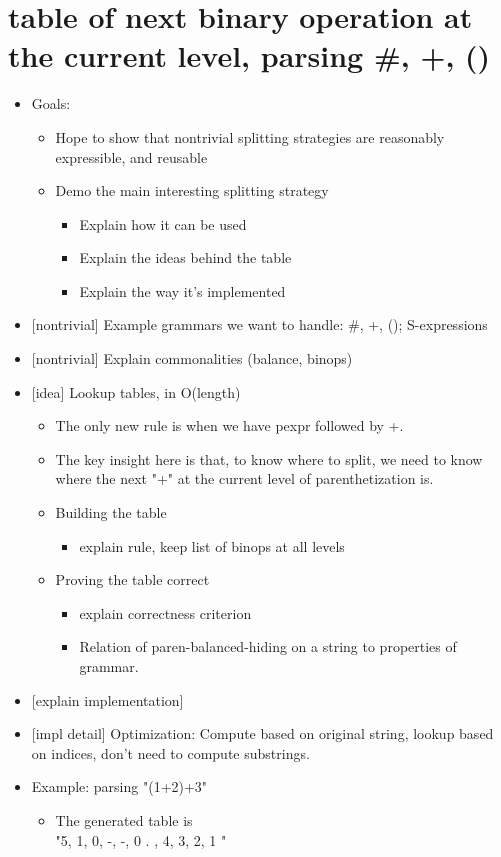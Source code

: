 \chapter{table of next binary operation at the current level, parsing \#, +, ()}
  \begin{itemize} \item  Goals:
    \begin{itemize} \item  Hope to show that nontrivial splitting strategies are reasonably expressible, and reusable 
    \item  Demo the main interesting splitting strategy 
      \begin{itemize} \item  Explain how it can be used 
      \item  Explain the ideas behind the table 
      \item  Explain the way it's implemented \end{itemize} \end{itemize}
  \item  {}[nontrivial] Example grammars we want to handle: \#, +, (); S-expressions
  \item  {}[nontrivial] Explain commonalities (balance, binops)
  \item  {}[idea] Lookup tables, in O(length)
    \begin{itemize} \item  The only new rule is when we have pexpr followed by +. 
    \item  The key insight here is that, to know where to split, we need to know where the next "+" at the current level of parenthetization is. 
    \item  Building the table 
      \begin{itemize} \item  explain rule, keep list of binops at all levels \end{itemize} 
    \item  Proving the table correct 
      \begin{itemize} \item  explain correctness criterion 
      \item  Relation of paren-balanced-hiding on a string to properties of grammar. \end{itemize} \end{itemize}
  \item  {}[explain implementation]
  \item  {}[impl detail] Optimization: Compute based on original string, lookup based on indices, don't need to compute substrings.
  \item  Example: parsing "(1+2)+3"
    \begin{itemize} \item  The generated table is  \\
      "5, 1, 0, -, -, 0 .
        , 4, 3, 2, 1
      "
\end{itemize} \end{itemize}